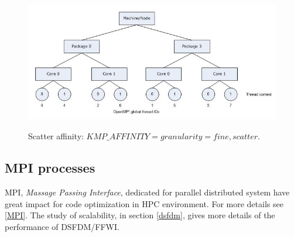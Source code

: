 \begin{figure}[!h]
\centering 
\includegraphics[height=6cm,width=12cm]{images/scatter.png} 
    \caption{Scatter affinity: $KMP\_AFFINITY=granularity=fine,scatter$.}  
\label{scatter} 
\end{figure}  
\subsection{MPI processes} 
MPI, \textit{Massage Passing Interface}, dedicated for parallel distributed system have great impact for code optimization in HPC environment. For more details see \ref{MPI}. The study of scalability, in section \ref{dsfdm}, gives more details of the performance of DSFDM/FFWI. 
